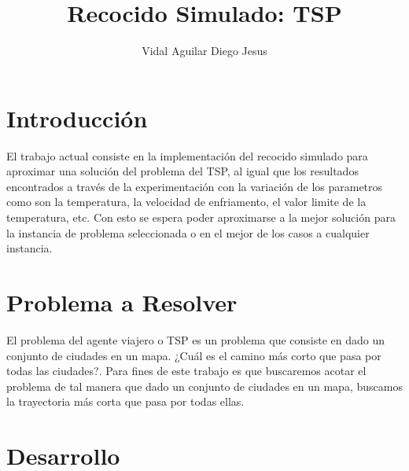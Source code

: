 

\author{Vidal Aguilar Diego Jesus}
\title{Recocido Simulado: TSP}


\titulo

\begin{multicols}{2}



\section{Introducción}

El trabajo actual consiste en la implementación del recocido simulado para aproximar una solución del problema del TSP, al igual que los resultados encontrados a través de la experimentación con la variación de los parametros como son la temperatura, la velocidad de enfriamento, el valor limite de la temperatura, etc. Con esto se espera poder aproximarse a la mejor solución para la instancia de problema seleccionada o en el mejor de los casos a cualquier instancia.

\section{Problema a Resolver}

El problema del agente viajero o TSP es un problema que consiste en dado un conjunto de ciudades en un mapa. ¿Cuál es el camino más corto que pasa por todas las ciudades?. Para fines de este trabajo es que buscaremos acotar el problema de tal manera que dado un conjunto de ciudades en un mapa, buscamos la trayectoria más corta que pasa por todas ellas.

\section{Desarrollo}


\end{multicols}
